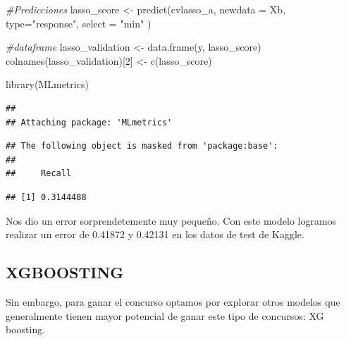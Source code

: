 \documentclass[
]{article}
\newenvironment{Shaded}{\begin{snugshade}}{\end{snugshade}}
\newcommand{\AttributeTok}[1]{\textcolor[rgb]{0.77,0.63,0.00}{#1}}
\newcommand{\CommentTok}[1]{\textcolor[rgb]{0.56,0.35,0.01}{\textit{#1}}}
\newcommand{\DecValTok}[1]{\textcolor[rgb]{0.00,0.00,0.81}{#1}}
\newcommand{\FunctionTok}[1]{\textcolor[rgb]{0.00,0.00,0.00}{#1}}
\newcommand{\NormalTok}[1]{#1}
\newcommand{\OtherTok}[1]{\textcolor[rgb]{0.56,0.35,0.01}{#1}}
\newcommand{\SpecialCharTok}[1]{\textcolor[rgb]{0.00,0.00,0.00}{#1}}
\newcommand{\StringTok}[1]{\textcolor[rgb]{0.31,0.60,0.02}{#1}}
\begin{document}
\begin{Shaded}
\begin{Highlighting}[]
\CommentTok{\#Predicciones}
\NormalTok{lasso\_score }\OtherTok{\textless{}{-}} \FunctionTok{predict}\NormalTok{(cvlasso\_a,}
               \AttributeTok{newdata =}\NormalTok{ Xb,}
               \AttributeTok{type=}\StringTok{"response"}\NormalTok{,}
               \AttributeTok{select =} \StringTok{"min"}\NormalTok{ )}


\CommentTok{\#dataframe}
\NormalTok{lasso\_validation }\OtherTok{\textless{}{-}} \FunctionTok{data.frame}\NormalTok{(y, lasso\_score)}
\FunctionTok{colnames}\NormalTok{(lasso\_validation)[}\DecValTok{2}\NormalTok{] }\OtherTok{\textless{}{-}} \FunctionTok{c}\NormalTok{(}\StringTok{\textquotesingle{}lasso\_score\textquotesingle{}}\NormalTok{)}

\FunctionTok{library}\NormalTok{(MLmetrics)}
\end{Highlighting}
\end{Shaded}

\begin{verbatim}
## 
## Attaching package: 'MLmetrics'
\end{verbatim}

\begin{verbatim}
## The following object is masked from 'package:base':
## 
##     Recall
\end{verbatim}

\begin{Shaded}
\end{Shaded}

\begin{verbatim}
## [1] 0.3144488
\end{verbatim}

Nos dio un error sorprendetemente muy pequeño. Con este modelo logramos
realizar un error de 0.41872 y 0.42131 en los datos de test de Kaggle.

\hypertarget{xgboosting}{%
\subsection{XGBOOSTING}\label{xgboosting}}

Sin embargo, para ganar el concurso optamos por explorar otros modelos
que generalmente tienen mayor potencial de ganar este tipo de concursos:
XG boosting.
\end{document}
